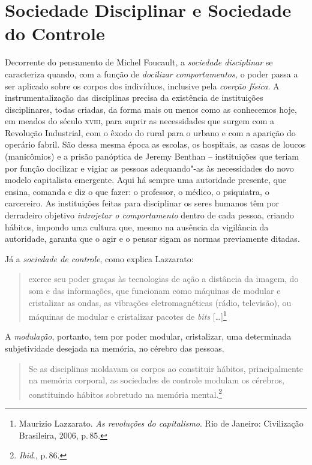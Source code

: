 \section{Sociedade Disciplinar e Sociedade do Controle}

Decorrente do pensamento de Michel Foucault, a \textit{sociedade
disciplinar} se caracteriza quando, com a função de \textit{docilizar
comportamentos,} o poder passa a ser aplicado sobre os corpos dos
indivíduos, inclusive pela \textit{coerção física}. A instrumentalização
das disciplinas precisa da existência de instituições disciplinares,
todas criadas, da forma mais ou menos como as conhecemos hoje, em meados
do século \textsc{xviii}, para suprir as necessidades que surgem com a Revolução
Industrial, com o êxodo do rural para o urbano e com a aparição do
operário fabril. São dessa mesma época as escolas, os hospitais, as
casas de loucos (manicômios) e a prisão panóptica de Jeremy Benthan --
instituições que teriam por função docilizar e vigiar as pessoas
adequando"-as às necessidades do novo modelo capitalista emergente. Aqui
há sempre uma autoridade presente, que ensina, comanda e diz o que
fazer: o professor, o médico, o psiquiatra, o carcereiro. As
instituições feitas para disciplinar os seres humanos têm por derradeiro
objetivo \textit{introjetar o comportamento} dentro de cada pessoa,
criando hábitos, impondo uma cultura que, mesmo na ausência da
vigilância da autoridade, garanta que o agir e o pensar sigam as normas
previamente ditadas.

Já a \textit{sociedade de controle}, como explica Lazzarato:

\begin{quote}
exerce seu poder graças às tecnologias de ação a distância da imagem, do
som e das informações, que funcionam como máquinas de modular e
cristalizar as ondas, as vibrações eletromagnéticas (rádio, televisão),
ou máquinas de modular e cristalizar pacotes de \textit{bits} {[}\ldots{}{]}\footnote{Maurizio Lazzarato. \textit{As revoluções do capitalismo}. Rio de Janeiro: Civilização
Brasileira, 2006, p.\,85.}
\end{quote}

A \textit{modulação}, portanto, tem por poder modular, cristalizar, uma
determinada subjetividade desejada na memória, no cérebro das pessoas.

\begin{quote}
Se as disciplinas moldavam os corpos ao constituir hábitos,
principalmente na memória corporal, as sociedades de controle modulam os
cérebros, constituindo hábitos sobretudo na memória mental.\footnote{\textit{Ibid}., p.\,86.}
\end{quote}

